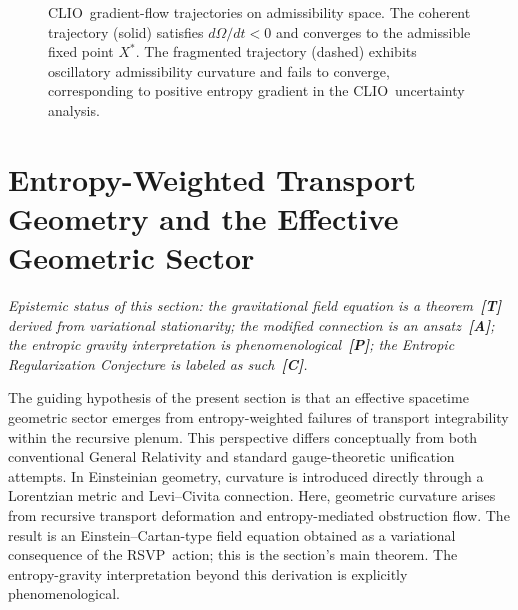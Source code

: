 \documentclass[12pt,a4paper]{article}
\newcommand{\RSVP}{\textrm{RSVP}}
\newcommand{\CLIO}{\textrm{CLIO}}
\begin{document}
\begin{figure}[ht]
\centering
{}
\caption{\CLIO\ gradient-flow trajectories on admissibility space. The coherent
trajectory (solid) satisfies $d\Omega/dt<0$ and converges to the admissible
fixed point $X^\ast$. The fragmented trajectory (dashed) exhibits oscillatory
admissibility curvature and fails to converge, corresponding to positive entropy
gradient in the \CLIO\ uncertainty analysis.}
\label{fig:clio-flow}
\end{figure}

\section{Entropy-Weighted Transport Geometry and the Effective Geometric Sector}

\emph{Epistemic status of this section: the gravitational field equation is a
theorem~\textbf{[T]} derived from variational stationarity; the modified connection
is an ansatz~\textbf{[A]}; the entropic gravity interpretation is
phenomenological~\textbf{[P]}; the Entropic Regularization Conjecture is
labeled as such~\textbf{[C]}.}

The guiding hypothesis of the present section is that an effective spacetime
geometric sector emerges from entropy-weighted failures of transport
integrability within the recursive plenum. This perspective differs conceptually
from both conventional General Relativity and standard gauge-theoretic
unification attempts. In Einsteinian geometry, curvature is introduced directly
through a Lorentzian metric and Levi--Civita connection. Here, geometric
curvature arises from recursive transport deformation and entropy-mediated
obstruction flow. The result is an Einstein--Cartan-type field equation obtained
as a variational consequence of the \RSVP\ action; this is the section's main
theorem. The entropy-gravity interpretation beyond this derivation is explicitly
phenomenological.
\end{document}
